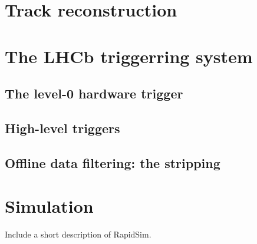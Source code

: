 


\section{Track reconstruction} %
\label{sec:reconstruction}


\section{The LHCb triggerring system} %
\label{sec:the_lhcb_triggerring_system}


\subsection{The level-0 hardware trigger} %
\label{sub:the_level_0_hardware_trigger}


\subsection{High-level triggers} %
\label{sub:high_level_triggers}


\subsection{Offline data filtering: the \lhcb stripping} %
\label{sub:offline_data_filtering_the_lhcb_stripping}





\section{Simulation} %
\label{sec:simulation}

Include a short description of RapidSim.

